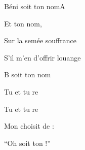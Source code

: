 \begin{song}{B\'eni soit ton nom}{A}
\begin{SBVerse}
Et   ton nom,

Sur la  sem\'ee  souffrance

S'il m'en  d'offrir  louange

B soit ton nom 


	\end{SBVerse}


	\begin{SBChorus}
	 
Tu  et tu re

Tu  et tu re

Mon  choisit de  :

``Oh  soit ton  !''
	\end{SBChorus}


\end{song}
